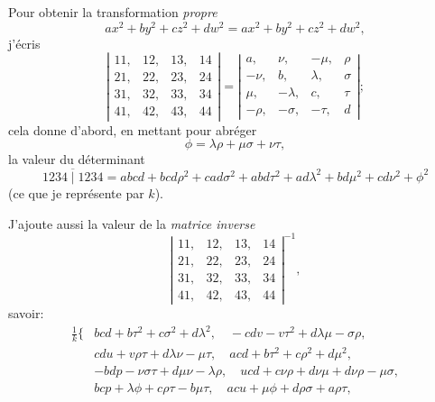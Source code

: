 \documentclass[11pt,a4paper]{article}
\begin{document}
\medskip

Pour obtenir la transformation \textit{propre}
\[
ax^2 + by^2 + cz^2 + dw^2 = ax^2 + by^2 + cz^2 + dw^2,
\]
j'\'ecris
\[
\left\lvert\begin{array}{cccc}
11, & 12, & 13, & 14\\
21, & 22, & 23, & 24\\
31, & 32, & 33, & 34\\
41, & 42, & 43, & 44
\end{array}\right\rvert =
\left\lvert\begin{array}{cccc}
a, & \nu, & -\mu, & \rho\\
-\nu, & b, & \lambda, & \sigma\\
\mu, & -\lambda, & c, & \tau\\
-\rho, & -\sigma, & -\tau, & d
\end{array}\right\rvert ;
\]
cela donne d'abord, en mettant pour abr\'eger
\[
\phi = \lambda\rho + \mu\sigma + \nu\tau,
\]
la valeur du d\'eterminant
\[
\overline{1234 \mid 1234} = abcd + bcd\rho^2 + cad\sigma^2 + abd\tau^2 + ad\lambda^2 + bd\mu^2 + cd\nu^2 + \phi^2
\]
(ce que je repr\'esente par $k$).

\medskip

J'ajoute aussi la valeur de la \textit{matrice inverse}
\[
\left\lvert\begin{array}{cccc}
11, & 12, & 13, & 14\\
21, & 22, & 23, & 24\\
31, & 32, & 33, & 34\\
41, & 42, & 43, & 44
\end{array}\right\rvert^{-1},
\]
savoir:
\begin{align*}
\frac{1}{k}\bigl\{ & bcd + b\tau^2 + c\sigma^2 + d\lambda^2,\quad -cdv - v\tau^2 + d\lambda\mu - \sigma\rho,\\
& cdu + v\rho\tau + d\lambda\nu - \mu\tau,\quad acd + b\tau^2 + c\rho^2 + d\mu^2,\\
& -bdp - \nu\sigma\tau + d\mu\nu - \lambda\rho,\quad ucd + c\nu\rho + d\nu\mu + d\nu\rho - \mu\sigma,\\
& bcp + \lambda\phi + c\rho\tau - b\mu\tau,\quad acu + \mu\phi + d\rho\sigma + a\rho\tau,\\
\end{align*}
\medskip
\end{document}
